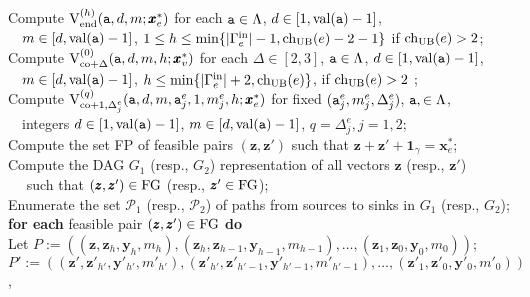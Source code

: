 \documentclass[12pt]{article}
\newcommand{\inn}{\mathrm{in}}
\newcommand{\co}{\mathrm{co}}
\newcommand{\V}{{\rm V}}
\newcommand{\ta}{{\tt a}}
\newcommand{\w}{\pmb{w}}
\newcommand{\y}{\pmb{y}}
\newcommand{\x}{\pmb{x}}
\newcommand{\z}{\pmb{z}}
\newcommand{\1}{\pmb{1}}
\newcommand{\0}{\pmb{0}}
\newcommand{\val}{\mathrm{val}}
\newcommand{\en}{\mathrm{end}}
\newcommand{\W}{\mathrm{W}}
\begin{document}
\begin{tabbing}
	Compute 
	$\V_{\en}^{(h)}(\ta, d, m; \x^*_e)$ for each 
	$\ta \in \Lambda$, $d \in [1, \val(\ta)-1]$, \\
~~$m \in [d, \val(\ta)-1]$, 
     $1 \leq h \leq \min\{|\Gamma^{\inn}_e| -1, 
     {\rm ch}_{{\rm UB}}(e)-2-1\}$
     if 
	${\rm ch}_{{\rm UB}}(e) > 2$;\\
	Compute 
	$\V_{\co + \Delta}^{(0)}(\ta, d, m, h; \x^*_v)$ for each 
     $\Delta \in [2, 3]$, 
     $\ta \in \Lambda$, $d \in [1, \val(\ta)-1]$, \\
~~$m \in [d, \val(\ta)-1]$, 
     $h \leq \min\{|\Gamma^{\inn}_e| +2, 
     {\rm ch}_{{\rm UB}}(e)\}$, 
     if 
	${\rm ch}_{{\rm UB}}(e) > 2$ ;\\
	Compute $\V_{\co+1, \Delta^e_j}^{(q)}(\ta, d, m, \ta^e_j, 1,
	 m^e_j, h; \x^*_e)$ for fixed 
	$(\ta^e_j, m^e_j, \Delta^e_j)$, 
	$\ta, \in \Lambda$, \\
	~~integers
	$d  \in [1, \val(\ta) - 1]$, 
	$m\in [d,\val(\ta)-1]$, 
	$q = \Delta_j ^e, j = 1, 2$;\\
%            
Compute the set FP of feasible pairs 
$(\z, \z')$ such that $\z  +\z' + \1_{\gamma} = \x_e^*$;\\
Compute the DAG $G_1$ (resp., $G_2$) representation of 
all vectors $\z$ (resp., $\z'$)\\
~~ such that $(\z, \z') \in {\rm FG}$ 
(resp., $\z' \in {\rm FG}$);\\
Enumerate the set $\mathcal{P}_1$ (resp., $\mathcal{P}_2$) of paths
from sources to sinks in $G_1$ (resp., $G_2$);\\
{\bf for each } feasible pair $(\z, \z') \in {\rm FG}$ {\bf do}\+ \\
Let $P := ((\z, \z_h, \y_h, m_h), (\z_h, \z_{h-1}, \y_{h-1}, m_{h-1}), \ldots, (\z_1, \z_{0}, \y_{0}, m_{0}))$;\\
$P' := ((\z', \z'_{h'}, \y'_{h'}, m'_{h'}), (\z'_{h'}, \z'_{h'-1}, \y'_{h'-1}, m'_{h'-1}), \ldots, (\z'_1, \z'_{0}, \y'_{0}, m'_{0}))$, \\

\end{tabbing}
\end{document}
